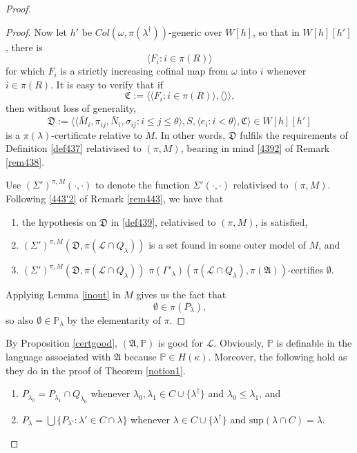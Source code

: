\documentclass[12pt, twoside]{memoir}
\numberwithin{equation}{section}
\theoremstyle{definition}
\theoremstyle{remark}
\theoremstyle{definition}
\theoremstyle{definition}
\theoremstyle{definition}
\theoremstyle{remark}
\begin{document}
\begin{proof}
\begin{proof}
Now let $h'$ be $Col(\omega, \pi(\lambda^{\dagger}))$-generic over $W[h]$, so that in $W[h][h']$, there is 
\begin{equation*}
    \langle F_i : i \in \pi(R) \rangle
\end{equation*}
for which $F_i$ is a strictly increasing cofinal map from $\omega$ into $i$ whenever $i \in \pi(R)$. It is easy to verify that if
\begin{equation*}
    \mathfrak{C} := \langle \langle F_i : i \in \pi(R) \rangle, \langle \rangle \rangle \text{,}
\end{equation*}
then without loss of generality,
\begin{equation*}
    \mathfrak{D} := \langle \langle \bar{M}_i, \pi_{ij},  \bar{N}_i, \sigma_{ij} : i \leq j \leq \theta \rangle, S, \langle e_i : i < \theta \rangle, \mathfrak{C} \rangle \in W[h][h']
\end{equation*}
is a $\pi(\lambda)$-certificate relative to $M$. In other words, $\mathfrak{D}$ fulfils the requirements of Definition \ref{def437} relativised to $(\pi, M)$, bearing in mind \ref{4392} of Remark \ref{rem438}. 

Use $(\Sigma')^{\pi, M}(\cdot, \cdot)$ to denote the function $\Sigma'(\cdot, \cdot)$ relativised to $(\pi, M)$. Following \ref{443'2} of Remark \ref{rem443}, we have that
\begin{enumerate}[label=(\alph*)]
    \item the hypothesis on $\mathfrak{D}$ in \ref{def439}, relativised to $(\pi, M)$, is satisfied, 
    \item $(\Sigma')^{\pi, M}(\mathfrak{D}, \pi(\mathcal{L} \cap Q_{\lambda}))$ is a set found in some outer model of $M$, and
    \item $(\Sigma')^{\pi, M}(\mathfrak{D}, \pi(\mathcal{L} \cap Q_{\lambda}))$ $\pi(\Gamma'_{\lambda}) (\pi(\mathcal{L} \cap Q_{\lambda}), \pi(\mathfrak{A}))$-certifies $\emptyset$. 
\end{enumerate}
Applying Lemma \ref{inout} in $M$ gives us the fact that 
\begin{equation*}
    \emptyset \in \pi(P_{\lambda}) \text{,}
\end{equation*}
so also $\emptyset \in \mathbb{P}_{\lambda}$ by the elementarity of $\pi$. 
\end{proof}

By Proposition \ref{certgood}, $(\mathfrak{A}, \mathbb{P})$ is good for $\mathcal{L}$. Obviously, $\mathbb{P}$ is definable in the language associated with $\mathfrak{A}$ because $\mathbb{P} \in H(\kappa)$. Moreover, the following hold as they do in the proof of Theorem \ref{notion1}.
\begin{enumerate}[label=(P\arabic*), leftmargin=40pt]
    \item\label{p1'} $P_{\lambda_0} = P_{\lambda_1} \cap Q_{\lambda_0}$ whenever $\lambda_0, \lambda_1 \in C \cup \{\lambda^{\dagger}\}$ and $\lambda_0 \leq \lambda_1$, and
    \item\label{p2'} $P_{\lambda} = \bigcup \{P_{\lambda'} : \lambda' \in C \cap \lambda\}$ whenever $\lambda \in C \cup \{\lambda^{\dagger}\}$ and $\mathrm{sup}(\lambda \cap C) = \lambda$.
\end{enumerate}


\end{proof}
\end{document}
